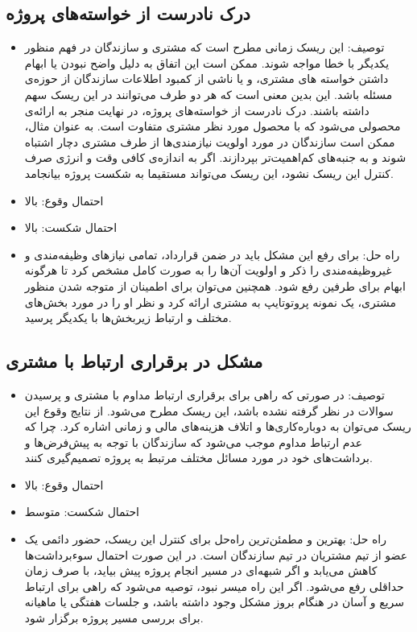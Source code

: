 \documentclass{article}
\begin{document}
\subsection{درک نادرست از خواسته‌های پروژه}
\begin{itemize}
\item توصیف: این ریسک زمانی مطرح است که مشتری و سازندگان در فهم منظور یکدیگر با خطا مواجه شوند. ممکن است این اتفاق به دلیل واضح نبودن یا ابهام داشتن خواسته های مشتری، و یا ناشی از کمبود اطلاعات سازندگان از حوزه‌ی مسئله باشد. این بدین معنی است که هر دو طرف می‌توانند در این ریسک سهم داشته باشند. درک نادرست از خواسته‌های پروژه، در نهایت منجر به ارائه‌ی محصولی می‌شود که با محصول مورد نظر مشتری متفاوت است. به عنوان مثال، ممکن است سازندگان در مورد اولویت نیازمندی‌ها از طرف مشتری دچار اشتباه شوند و به جنبه‌های کم‌اهمیت‌تر بپردازند. اگر به اندازه‌ی کافی وقت و انرژی صرف کنترل این ریسک نشود، این ریسک می‌تواند مستقیما به شکست پروژه بیانجامد.
\item احتمال وقوع: بالا
\item احتمال شکست: بالا
\item راه حل: برای رفع این مشکل باید در ضمن قرارداد، تمامی نیازهای وظیفه‌مندی و غیروظیفه‌مندی را ذکر و اولویت آن‌ها را به صورت کامل مشخص کرد تا هرگونه ابهام برای طرفین رفع شود. همچنین می‌توان برای اطمینان از متوجه شدن منظور مشتری، یک نمونه پروتوتایپ به مشتری ارائه کرد و نظر او را در مورد بخش‌های مختلف و ارتباط زیربخش‌ها با یکدیگر پرسید.
\end{itemize}

\subsection{مشکل در برقراری ارتباط با مشتری}
\begin{itemize}
\item توصیف: در صورتی که راهی برای برقراری ارتباط مداوم با مشتری و پرسیدن سوالات در نظر گرفته نشده باشد، این ریسک مطرح می‌شود. از نتایج وقوع این ریسک می‌توان به دوباره‌کاری‌ها و اتلاف هزینه‌های مالی و زمانی اشاره کرد. چرا که عدم ارتباط مداوم موجب می‌شود که سازندگان با توجه به پیش‌فرض‌ها و برداشت‌های خود در مورد مسائل مختلف مرتبط به پروژه تصمیم‌گیری کنند.
\item احتمال وقوع: بالا
\item احتمال شکست: متوسط
\item راه حل: بهترین و مطمئن‌ترین راه‌حل برای کنترل این ریسک، حضور دائمی یک عضو از تیم مشتریان در تیم سازندگان است. در این صورت احتمال سوءبرداشت‌ها کاهش می‌یابد و اگر شبهه‌ای در مسیر انجام پروژه پیش بیاید، با صرف زمان حداقلی رفع می‌شود. اگر این راه میسر نبود، توصیه می‌شود که راهی برای ارتباط سریع و آسان در هنگام بروز مشکل وجود داشته باشد، و جلسات هفتگی یا ماهیانه برای بررسی مسیر پروژه برگزار شود.
\end{itemize}
\end{document}
